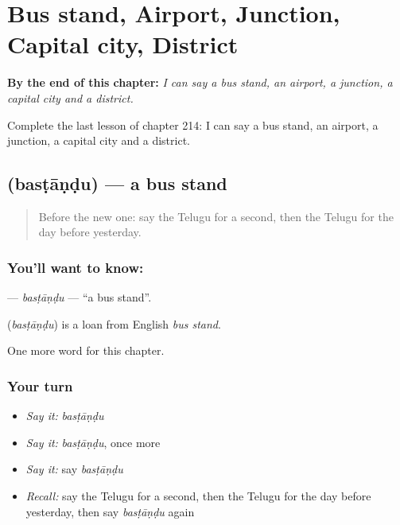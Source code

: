 
\chapter{Bus stand, Airport, Junction, Capital city, District}
\label{ch:te-bus-stand-airport-junction-capital-city-district}

\begin{chapteropening}
\textbf{By the end of this chapter:} \emph{I can say a bus stand, an airport, a junction, a capital city and a district.}

Complete the last lesson of chapter 214: I can say a bus stand, an airport, a junction, a capital city and a district.
\end{chapteropening}

\section[\texorpdfstring{\te{బస్టాండు} (basṭāṇḍu)}{బస్టాండు (basṭāṇḍu)}]{ (basṭāṇḍu) — a bus stand}

\label{lesson:TE-C214-bastandu}



\begin{quote}
Before the new one: say the Telugu for a second, then the Telugu for the day before yesterday.
\end{quote}

\subsection*{You'll want to know: }
\textbf{} — \emph{basṭāṇḍu} — \textquotedblleft{}a bus stand\textquotedblright{}.

\begin{cousinweb}
\textbf{} (\emph{basṭāṇḍu}) is a loan from English \emph{bus stand}.
\end{cousinweb}

\begin{grammarlens}[title={What you've built}]
One more word for this chapter.
\end{grammarlens}

\subsection*{Your turn}
\begin{itemize}
\raggedright
  \item \emph{Say it:} \emph{basṭāṇḍu}
  \item \emph{Say it:} \emph{basṭāṇḍu}, once more
  \item \emph{Say it:} say \emph{basṭāṇḍu}
  \item \emph{Recall:} say the Telugu for a second, then the Telugu for the day before yesterday, then say \emph{basṭāṇḍu} again
\end{itemize}

